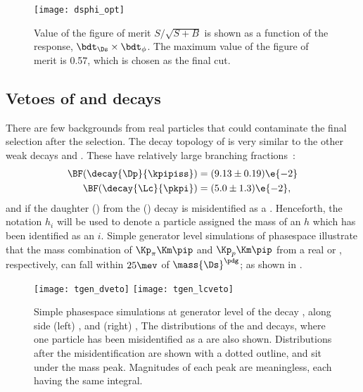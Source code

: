 \begin{figure}
  \begin{center}
    \texttt{[image: dsphi\_opt]}
    \caption{\small
      Value of the figure of merit $S/\sqrt{S+B}$ is shown as a function of the \bdt response,
      $\bdt_{\Ds}\times\bdt_{\phi}$.
      The maximum value of the figure of merit is 0.57, which is chosen as the final \bdt cut.
    }
    \label{fig:dsphi:opt}
  \end{center}
\end{figure}





\subsection{Vetoes of \Dp and \Lc decays}
There are few backgrounds from real particles that could contaminate the final selection after the
\bdt selection.
The decay topology of \dstokkpi is very similar to the other weak decays \decay{\Dp}{\kpipiss} and
\decay{\Lc}{\pkpi}.
These have relatively large branching fractions~\cite{PDG2012}:
\begin{align}
  \BF(\decay{\Dp}{\kpipiss}) &= (9.13\pm0.19)\e{-2} \\
  \BF(\decay{\Lc}{\pkpi}) &= (5.0\pm1.3)\e{-2},
\end{align}
and if the daughter \pip(\proton) from the \Dp(\Lc) decay is misidentified as a \Kp.
Henceforth, the notation $h_i$ will be used to denote a particle assigned the mass of an $h$ which
has been identified as an $i$.
Simple generator level simulations of phasespace illustrate that
the mass combination of $\Kp_\pi\Km\pip$ and $\Kp_p\Km\pip$ from a real \Dp or \Lc, respectively,
can fall within $25\mev$ of $\mass{\Ds}^\pdg$; as shown in .


\begin{figure}
  \begin{center}
    \texttt{[image: tgen\_dveto]}
    \texttt{[image: tgen\_lcveto]}
    \caption{\small
      Simple phasespace simulations at generator level of the decay \decay{\Ds}{\kkpi}, along side
      (left) \decay{\Dp}{\kpipiss}, and
      (right) \decay{\Lc}{\pkpi},
      The distributions of the \Dp and \Lc decays, where one particle has been misidentified as a
      \Kp are also shown.
      Distributions after the misidentification are shown with a dotted outline, and sit under the
      \Ds mass peak.
      Magnitudes of each peak are meaningless, each having the same integral.
    }
    \label{fig:dsphi:veto}
  \end{center}
\end{figure}

